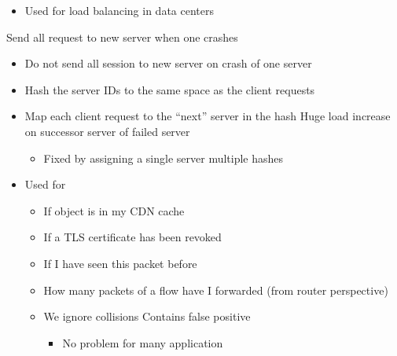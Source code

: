 \begin{itemize}
\begin{itemize}
\begin{itemize}
\begin{itemize}
                            \item Used for load balancing in data centers
                        \end{itemize}
                    \icon Send all request to new server when one crashes
                \end{itemize}
                \begin{itemize}
                    \item Do not send all session to new server on crash of one server
                    \item Hash the server IDs to the same space as the client requests
                    \item Map each client request to the ``next'' server in the hash
                    \icon Huge load increase on successor server of failed server
                        \begin{itemize}
                            \item Fixed by assigning a single server multiple hashes
                        \end{itemize}
                \end{itemize}
        \end{itemize}
        \begin{itemize}
            \item Used for
                \begin{itemize}
                    \item If object is in my CDN cache
                    \item If a TLS certificate has been revoked
                    \item If I have seen this packet before
                    \item How many packets of a flow have I forwarded (from router perspective)
                \end{itemize}
                \begin{itemize}
                    \item We ignore collisions
                    \icon Contains false positive
                        \begin{itemize}
                            \item No problem for many application
                                \begin{itemize}

\end{itemize}
\end{itemize}
\end{itemize}
\end{itemize}
\end{itemize}
